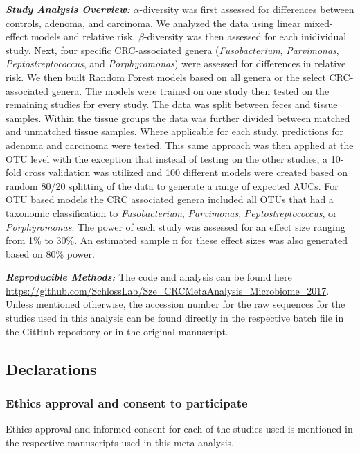 \documentclass[12pt,]{article}
\begin{document}
\textbf{\emph{Study Analysis Overview:}} \(\alpha\)-diversity was first
assessed for differences between controls, adenoma, and carcinoma. We
analyzed the data using linear mixed-effect models and relative risk.
\(\beta\)-diversity was then assessed for each inidividual study. Next,
four specific CRC-associated genera (\emph{Fusobacterium},
\emph{Parvimonas}, \emph{Peptostreptococcus}, and \emph{Porphyromonas})
were assessed for differences in relative risk. We then built Random
Forest models based on all genera or the select CRC-associated genera.
The models were trained on one study then tested on the remaining
studies for every study. The data was split between feces and tissue
samples. Within the tissue groups the data was further divided between
matched and unmatched tissue samples. Where applicable for each study,
predictions for adenoma and carcinoma were tested. This same approach
was then applied at the OTU level with the exception that instead of
testing on the other studies, a 10-fold cross validation was utilized
and 100 different models were created based on random 80/20 splitting of
the data to generate a range of expected AUCs. For OTU based models the
CRC associated genera included all OTUs that had a taxonomic
classification to \emph{Fusobacterium}, \emph{Parvimonas},
\emph{Peptostreptococcus}, or \emph{Porphyromonas}. The power of each
study was assessed for an effect size ranging from 1\% to 30\%. An
estimated sample n for these effect sizes was also generated based on
80\% power.

\textbf{\emph{Reproducible Methods:}} The code and analysis can be found
here
\url{https://github.com/SchlossLab/Sze_CRCMetaAnalysis_Microbiome_2017}.
Unless mentioned otherwise, the accession number for the raw sequences
for the studies used in this analysis can be found directly in the
respective batch file in the GitHub repository or in the original
manuscript.

\newpage

\subsection{Declarations}\label{declarations}

\subsubsection{Ethics approval and consent to
participate}\label{ethics-approval-and-consent-to-participate}

Ethics approval and informed consent for each of the studies used is
mentioned in the respective manuscripts used in this meta-analysis.
\end{document}
